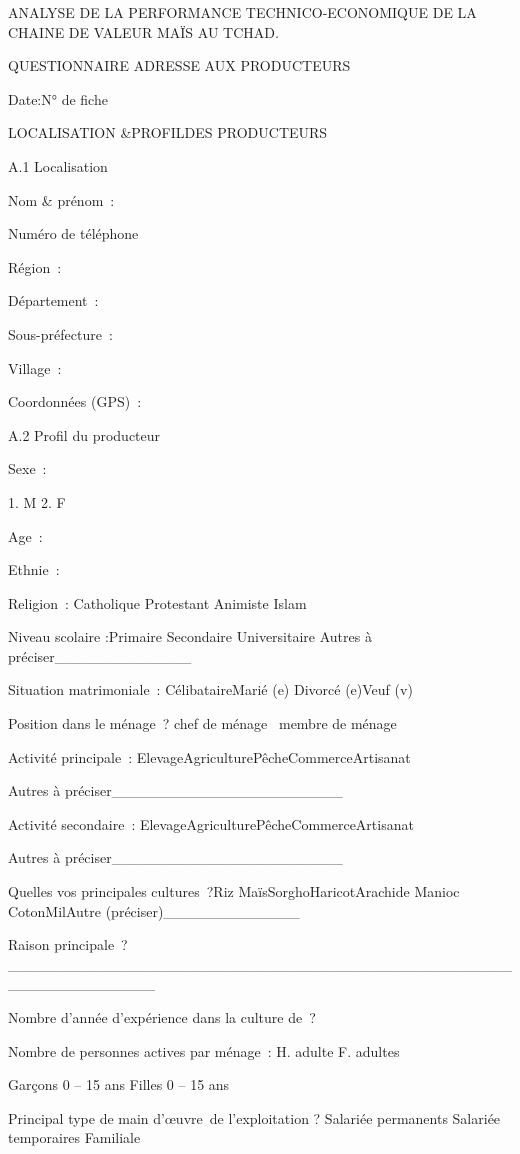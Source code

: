 \documentclass[12pt,oneside]{report}
\begin{document}
ANALYSE DE LA PERFORMANCE TECHNICO-ECONOMIQUE DE LA CHAINE DE VALEUR  MAÏS AU TCHAD.

QUESTIONNAIRE ADRESSE AUX PRODUCTEURS

Date:N° de fiche

LOCALISATION \&PROFILDES PRODUCTEURS

A.1 Localisation

Nom \& prénom :

Numéro de téléphone

Région :

Département :

Sous-préfecture :

Village :

Coordonnées (GPS) :

A.2 Profil du producteur

Sexe :

1. M   2. F

Age :

Ethnie :

Religion : Catholique   Protestant     Animiste Islam

Niveau scolaire :Primaire Secondaire Universitaire Autres  à préciser\_\_\_\_\_\_\_\_\_\_\_\_\_

Situation matrimoniale :    CélibataireMarié (e) Divorcé (e)Veuf (v)

Position dans le ménage ? chef de ménage     membre de ménage

Activité principale :   ElevageAgriculturePêcheCommerceArtisanat

Autres à préciser\_\_\_\_\_\_\_\_\_\_\_\_\_\_\_\_\_\_\_\_\_\_

Activité secondaire : ElevageAgriculturePêcheCommerceArtisanat

Autres à préciser\_\_\_\_\_\_\_\_\_\_\_\_\_\_\_\_\_\_\_\_\_\_

Quelles vos principales cultures ?Riz MaïsSorghoHaricotArachide Manioc  CotonMilAutre (préciser)\_\_\_\_\_\_\_\_\_\_\_\_\_

Raison principale ?\_\_\_\_\_\_\_\_\_\_\_\_\_\_\_\_\_\_\_\_\_\_\_\_\_\_\_\_\_\_\_\_\_\_\_\_\_\_\_\_\_\_\_\_\_\_\_\_\_\_\_\_\_\_\_\_\_\_\_\_\_\_

Nombre d’année d’expérience dans la culture de ?

Nombre de personnes actives par ménage : H. adulte     F. adultes

Garçons 0 – 15 ans Filles 0 – 15 ans

Principal type de main d’œuvre de l’exploitation ? Salariée permanents  Salariée temporaires    Familiale
\end{document}
